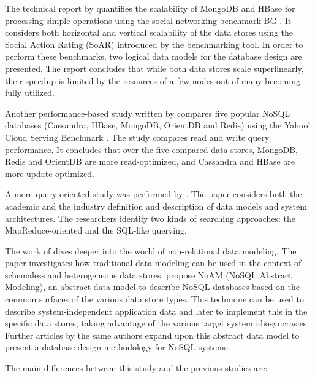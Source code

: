 The technical report by \textcite{Barahmand2015} quantifies the scalability of MongoDB and HBase for processing simple operations using the social networking benchmark BG \autocite{Barahmand2013}.
It considers both horizontal and vertical scalability of the data stores using the Social Action Rating (SoAR) introduced by the benchmarking tool.
In order to perform these benchmarks, two logical data models for the database design are presented.
The report concludes that while both data stores scale superlinearly, their speedup is limited by the resources of a few nodes out of many becoming fully utilized.

Another performance-based study written by \textcite{Abramova2014} compares five popular NoSQL databases (Cassandra, HBase, MongoDB, OrientDB and Redis) using the Yahoo! Cloud Serving Benchmark \autocite{Yahoo2010}.
The study compares read and write query performance.
It concludes that over the five compared data stores, MongoDB, Redis and OrientDB are more read-optimized, and Cassandra and HBase are more update-optimized.

A more query-oriented study was performed by \textcite{Zhou2013}.
The paper considers both the academic and the industry definition and description of data models and system architectures.
The researchers identify two kinds of searching approaches: the MapReduce-oriented and the SQL-like querying.

The work of \textcite{Atzeni2016} dives deeper into the world of non-relational data modeling.
The paper investigates how traditional data modeling can be used in the context of schemaless and heterogeneous data stores.
\citeauthor{Atzeni2016} propose NoAM (NoSQL Abstract Modeling), an abstract data model to describe NoSQL databases based on the common surfaces of the various data store types.
This technique can be used to describe system-independent application data and later to implement this in the specific data stores, taking advantage of the various target system idiosyncrasies.
Further articles by the same authors \autocite{Bugiotti2014} expand upon this abstract data model to present a database design methodology for NoSQL systems.


The main differences between this study and the previous studies are:

